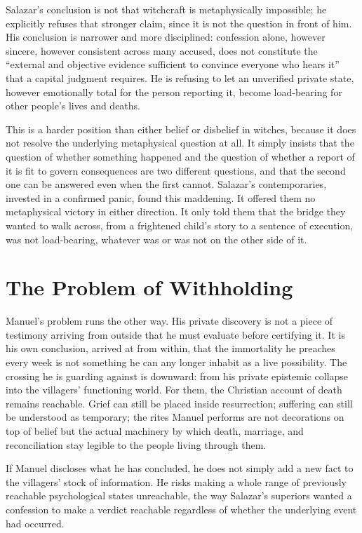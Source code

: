 \documentclass[12pt]{article}
\begin{document}
Salazar's conclusion is not that witchcraft is metaphysically impossible; he explicitly refuses that stronger claim, since it is not the question in front of him. His conclusion is narrower and more disciplined: confession alone, however sincere, however consistent across many accused, does not constitute the ``external and objective evidence sufficient to convince everyone who hears it'' that a capital judgment requires. He is refusing to let an unverified private state, however emotionally total for the person reporting it, become load-bearing for other people's lives and deaths.

This is a harder position than either belief or disbelief in witches, because it does not resolve the underlying metaphysical question at all. It simply insists that the question of whether something happened and the question of whether a report of it is fit to govern consequences are two different questions, and that the second one can be answered even when the first cannot. Salazar's contemporaries, invested in a confirmed panic, found this maddening. It offered them no metaphysical victory in either direction. It only told them that the bridge they wanted to walk across, from a frightened child's story to a sentence of execution, was not load-bearing, whatever was or was not on the other side of it.

\section*{The Problem of Withholding}

Manuel's problem runs the other way.\cite{unamuno1930} His private discovery is not a piece of testimony arriving from outside that he must evaluate before certifying it. It is his own conclusion, arrived at from within, that the immortality he preaches every week is not something he can any longer inhabit as a live possibility. The crossing he is guarding against is downward: from his private epistemic collapse into the villagers' functioning world. For them, the Christian account of death remains reachable. Grief can still be placed inside resurrection; suffering can still be understood as temporary; the rites Manuel performs are not decorations on top of belief but the actual machinery by which death, marriage, and reconciliation stay legible to the people living through them. 

If Manuel discloses what he has concluded, he does not simply add a new fact to the villagers' stock of information. He risks making a whole range of previously reachable psychological states unreachable, the way Salazar's superiors wanted a confession to make a verdict reachable regardless of whether the underlying event had occurred.
\end{document}
